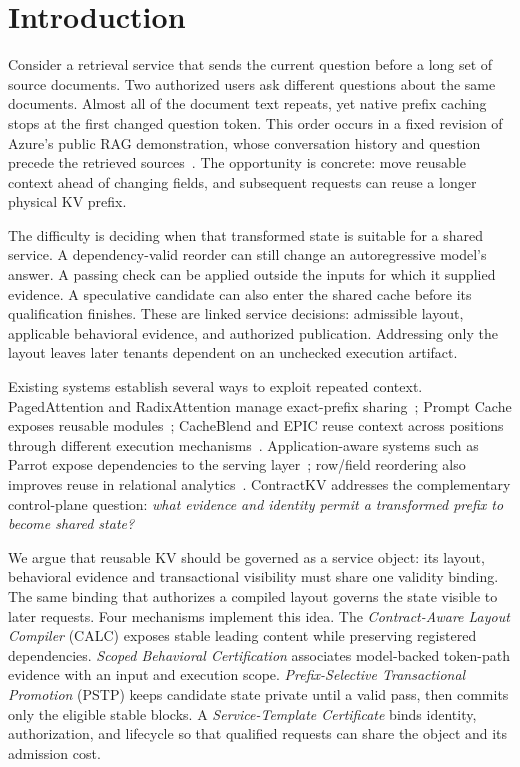 \section{Introduction}
\label{sec:introduction}

Consider a retrieval service that sends the current question before a long set of source documents. Two authorized users ask different questions about the same documents. Almost all of the document text repeats, yet native prefix caching stops at the first changed question token. This order occurs in a fixed revision of Azure's public RAG demonstration, whose conversation history and question precede the retrieved sources~\cite{azuretemplate}. The opportunity is concrete: move reusable context ahead of changing fields, and subsequent requests can reuse a longer physical KV prefix.

The difficulty is deciding when that transformed state is suitable for a shared service. A dependency-valid reorder can still change an autoregressive model's answer. A passing check can be applied outside the inputs for which it supplied evidence. A speculative candidate can also enter the shared cache before its qualification finishes. These are linked service decisions: admissible layout, applicable behavioral evidence, and authorized publication. Addressing only the layout leaves later tenants dependent on an unchecked execution artifact.

Existing systems establish several ways to exploit repeated context. PagedAttention and RadixAttention manage exact-prefix sharing~\cite{vllm2023,sglang2024}; Prompt Cache exposes reusable modules~\cite{promptcache2024}; CacheBlend and EPIC reuse context across positions through different execution mechanisms~\cite{cacheblend2025,epic2025}. Application-aware systems such as Parrot expose dependencies to the serving layer~\cite{parrot2024}; row/field reordering also improves reuse in relational analytics~\cite{llmqueries2025}. ContractKV addresses the complementary control-plane question: \emph{what evidence and identity permit a transformed prefix to become shared state?}

We argue that reusable KV should be governed as a service object: its layout, behavioral evidence and transactional visibility must share one validity binding. The same binding that authorizes a compiled layout governs the state visible to later requests. Four mechanisms implement this idea. The \emph{Contract-Aware Layout Compiler} (CALC) exposes stable leading content while preserving registered dependencies. \emph{Scoped Behavioral Certification} associates model-backed token-path evidence with an input and execution scope. \emph{Prefix-Selective Transactional Promotion} (PSTP) keeps candidate state private until a valid pass, then commits only the eligible stable blocks. A \emph{Service-Template Certificate} binds identity, authorization, and lifecycle so that qualified requests can share the object and its admission cost.

